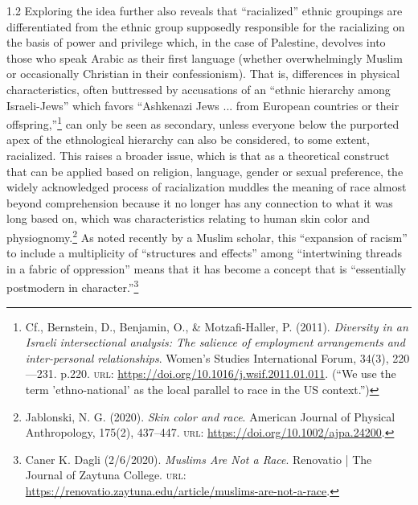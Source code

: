 \documentclass[../unravbook.tex]{subfiles}
\begin{document}
\begin{spacing}{1.2}
Exploring the idea further also reveals that ``racialized'' ethnic groupings are differentiated from the ethnic group supposedly responsible for the racializing on the basis of power and privilege which, in the case of Palestine, devolves into those who speak Arabic as their first language (whether overwhelmingly Muslim or occasionally Christian in their confessionism). That is, differences in physical characteristics, often buttressed by accusations of an ``ethnic hierarchy among Israeli-Jews'' which favors ``Ashkenazi Jews ... from European countries or their offspring,''\footnote{Cf., Bernstein, D., Benjamin, O., \& Motzafi-Haller, P. (2011). \textit{Diversity in an Israeli intersectional analysis: The salience of employment arrangements and inter-personal relationships}. Women's Studies International Forum, 34(3), 220---231. p.220. \textsc{url: } \url{https://doi.org/10.1016/j.wsif.2011.01.011}. (``We use the term 'ethno-national' as the local parallel to race in the US context.'')} can only be seen as secondary, unless everyone below the purported apex of the ethnological hierarchy can also be considered, to some extent, racialized. This raises a broader issue, which is that as a theoretical construct that can be applied based on religion, language, gender or sexual preference, the widely acknowledged process of racialization muddles the meaning of race almost beyond comprehension because it no longer has any connection to what it was long based on, which was characteristics relating to human skin color and physiognomy.\footnote{Jablonski, N. G. (2020). \textit{Skin color and race}. American Journal of Physical Anthropology, 175(2), 437--447. \textsc{url: } \url{https://doi.org/10.1002/ajpa.24200}.} As noted recently by a Muslim scholar, this ``expansion of racism'' to include a multiplicity of ``structures and effects'' among ``intertwining threads in a fabric of oppression'' means that it has become a concept that is ``essentially postmodern in character.''\footnote{Caner K. Dagli (2/6/2020). \textit{Muslims Are Not a Race}. Renovatio | The Journal of Zaytuna College. \textsc{url: } \url{https://renovatio.zaytuna.edu/article/muslims-are-not-a-race}.} 


\end{spacing}
\end{document}
